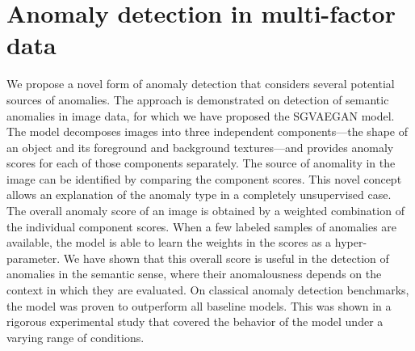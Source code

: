 \chapter{Anomaly detection in multi-factor data} \label{sec:chapter_sgvaegan}

We propose a novel form of anomaly detection that considers several potential sources of anomalies. The approach is demonstrated on detection of semantic anomalies in image data, for which we have proposed the SGVAEGAN model. The model decomposes images into three independent components---the shape of an object and its foreground and background textures---and provides anomaly scores for each of those components separately. The source of anomality in the image can be identified by comparing the component scores. This novel concept  allows an explanation of the anomaly type in a completely unsupervised case. 
The overall anomaly score of an image is obtained by a weighted combination of the individual component scores. When a few labeled samples of anomalies are available, the model is able to learn the weights in the scores as a hyper-parameter. We have shown that this overall score is useful in the detection of anomalies in the semantic sense, where their anomalousness depends on the context in which they are evaluated. On classical anomaly detection benchmarks, the model was proven to outperform all baseline models. This was shown in a rigorous experimental study that covered the behavior of the model under a varying range of conditions.

